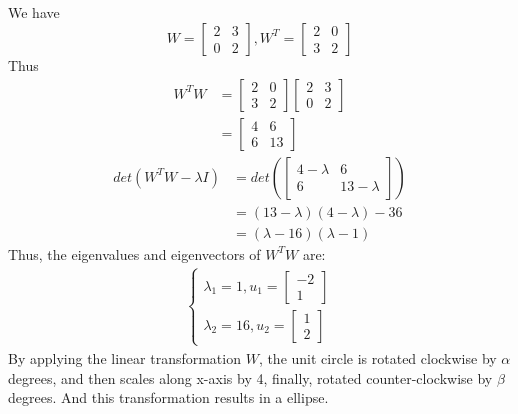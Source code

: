 \documentclass{article}
\begin{document}
\subsection{} %
We have
\[
    W = \begin{bmatrix}
    2 & 3 \\
    0 & 2
    \end{bmatrix}, W^T = \begin{bmatrix}
    2 & 0 \\
    3 & 2
    \end{bmatrix}
\]
Thus
\begin{align*}
    W^TW &= \begin{bmatrix}
    2 & 0 \\
    3 & 2
    \end{bmatrix}
    \begin{bmatrix}
    2 & 3 \\
    0 & 2
    \end{bmatrix} \\ 
    &= \begin{bmatrix}
    4 & 6 \\
    6 & 13 
    \end{bmatrix}
\end{align*}
\begin{align*}
    det( W^TW - \lambda I ) &= det \left ( \begin{bmatrix}
    4-\lambda & 6 \\
    6 & 13- \lambda
    \end{bmatrix}\right )\\
    &= (13 - \lambda )(4 - \lambda ) - 36\\
    &= (\lambda - 16)(\lambda - 1)
\end{align*}
Thus, the eigenvalues and eigenvectors of $ W^TW $ are:
\begin{align*}
    \begin{cases}
        \lambda_1 = 1 , u_1 = \begin{bmatrix}
        -2 \\
        1 
        \end{bmatrix} \\
        \lambda_2 = 16, u_2 = \begin{bmatrix}
        1 \\
        2 
        \end{bmatrix}
    \end{cases}
\end{align*}
By applying the linear transformation $ W $, the unit circle is rotated clockwise by $ \alpha $ degrees, and then scales along x-axis by 4, finally, rotated counter-clockwise by $ \beta $ degrees. And this transformation results in a ellipse.
\end{document}
